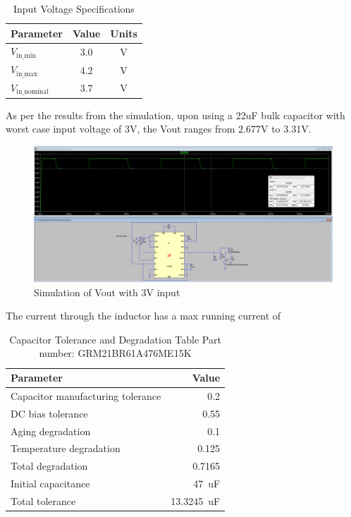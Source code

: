 \documentclass[a4paper,11pt]{article}%
\begin{document}
    \begin{table}[h!]
        \centering
        \begin{tabular}{|l|c|c|}
        \hline
        \textbf{Parameter}   & \textbf{Value} & \textbf{Units} \\ \hline
        $V_{\text{in\_min}}$    & 3.0            & V             \\ \hline
        $V_{\text{in\_max}}$    & 4.2            & V             \\ \hline
        $V_{\text{in\_nominal}}$ & 3.7            & V             \\ \hline
        \end{tabular}
        \caption{Input Voltage Specifications}
        \end{table}
        
    As per the results from the simulation, upon using a 22uF bulk capacitor with worst case input voltage of 3V, the Vout ranges from 2.677V to 3.31V. 
    \begin{figure}[H]
        \centering
        \includegraphics[width=\textwidth]{figures/Update5/3V_22uF_Vout_simulation.png}
        \caption{Simulation of Vout with 3V input}
    \end{figure}
        
    The current through the inductor has a max running current of 

\begin{table}[h!]
    \centering
    \begin{tabular}{|l|r|}
    \hline
    \textbf{Parameter}                   & \textbf{Value} \\ \hline
    Capacitor manufacturing tolerance     & 0.2            \\ \hline
    DC bias tolerance                     & 0.55           \\ \hline
    Aging degradation                                & 0.1            \\ \hline
    Temperature degradation                          & 0.125          \\ \hline
    Total degradation                     & 0.7165         \\ \hline
    Initial capacitance                   & 47 \,uF         \\ \hline
    Total tolerance                       & 13.3245 \,uF    \\ \hline
    \end{tabular}
    \caption{Capacitor Tolerance and Degradation Table Part number: GRM21BR61A476ME15K}
    \end{table}
\end{document}
